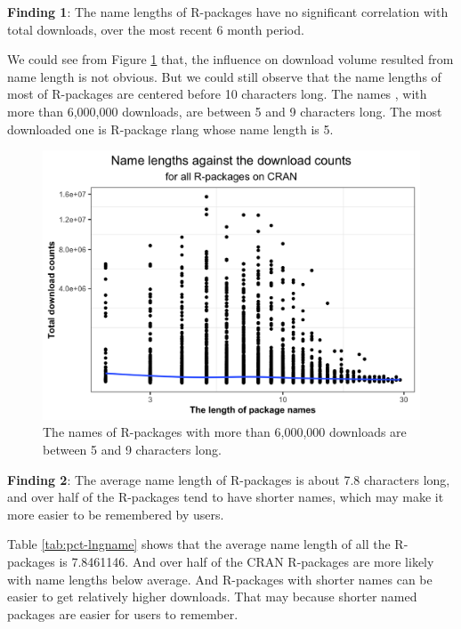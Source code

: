 \documentclass[
]{book}
\newenvironment{discovery}[1]{%
  \begin{tcolorbox}[colback=blue!30,colframe=blue!80!black]#1}{\end{tcolorbox}}
\begin{document}
\begin{discovery}
\textbf{Finding 1}: The name lengths of R-packages have no significant
correlation with total downloads, over the most recent 6 month period.
\end{discovery}

We could see from Figure \ref{fig:namelength-plot} that, the influence on download volume resulted from name length is not obvious. But we could still observe that the name lengths of most of R-packages are centered before 10 characters long. The names , with more than 6,000,000 downloads, are between 5 and 9 characters long. The most downloaded one is R-package rlang whose name length is 5.



\begin{figure}

{\centering \includegraphics{figures/namelength-plot-1} 

}

\caption{The names of R-packages with more than 6,000,000 downloads are between 5 and 9 characters long.}\label{fig:namelength-plot}
\end{figure}

\begin{discovery}
\textbf{Finding 2}: The average name length of R-packages is about 7.8
characters long, and over half of the R-packages tend to have shorter
names, which may make it more easier to be remembered by users.
\end{discovery}

Table \ref{tab:pct-lngname} shows that the average name length of all the R-packages is 7.8461146. And over half of the CRAN R-packages are more likely with name lengths below average. And R-packages with shorter names can be easier to get relatively higher downloads. That may because shorter named packages are easier for users to remember.
\end{document}
